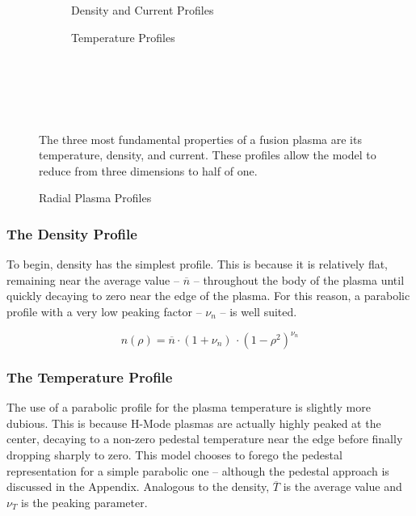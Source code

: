 \begin{figure*}
	\label{fig:profiles}
    \centering
    \hfill 
    \begin{subfigure}[t]{0.45\textwidth}
        \centering
		\begin{adjustbox}{width=\textwidth}
			\Large
			
		\end{adjustbox}
        \caption{Density and Current Profiles}
    \end{subfigure}
    \hfill
    \begin{subfigure}[t]{0.45\textwidth}
        \centering
		\begin{adjustbox}{width=\textwidth}
			\Large
			
		\end{adjustbox}
        \caption{Temperature Profiles}
    \end{subfigure}
    \hfill \hfill ~\\ ~\\ ~\\
    \caption{Radial Plasma Profiles} ~\\
    \small The three most fundamental properties of a fusion plasma are its temperature, density, and current. These profiles allow the model to reduce from three dimensions to half of one.
\end{figure*}

\subsubsection{The Density Profile}

To begin, density has the simplest profile. This is because it is relatively flat, remaining near the average value -- $\overline n$ -- throughout the body of the plasma until quickly decaying to zero near the edge of the plasma. For this reason, a parabolic profile with a very low peaking factor -- $\nu_n$ -- is well suited.

\begin{equation}
	n(\rho) = \overline n \cdot ( 1 + \nu_n ) \, \cdot ( 1 - \rho ^ 2 ) ^ {\nu_n}
\end{equation}

\subsubsection{The Temperature Profile}

The use of a parabolic profile for the plasma temperature is slightly more dubious. This is because H-Mode plasmas are actually highly peaked at the center, decaying to a non-zero pedestal temperature near the edge before finally dropping sharply to zero. This model chooses to forego the pedestal representation for a simple parabolic one -- although the pedestal approach is discussed in the Appendix. Analogous to the density, $\overline T$ is the average value and $\nu_T$ is the peaking parameter.

